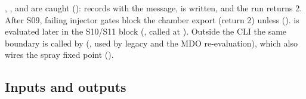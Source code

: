 , ,  and
 are caught (): 
records  with the message,  is written,
and the run returns 2. After S09, failing injector gates block the chamber export
(return 2) unless  ().
 is evaluated later in the S10/S11 block
(, called at ). Outside the CLI the same
boundary is called by  (, used by
legacy  and the MDO re-evaluation), which also wires the spray
fixed point ().

\subsection{Inputs and outputs}

